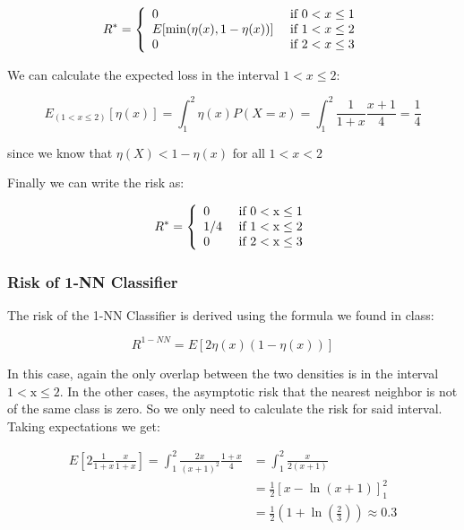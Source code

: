 \documentclass[a4paper, 11pt]{article} %
\begin{document}
$$R ^ { * } = \left\{ \begin{array} { l l } { 0 } & { \text { if } 0 < x \leq 1 } \\ {E [ \min ( \eta ( x ) , 1 - \eta ( x ) ) ] } & { \text { if } 1 < x \leq 2 } \\ { 0 } & { \text { if } 2 < x \leq 3 } \end{array} \right.$$

We can calculate the expected loss in the interval $1 < x \leq 2$:

$$E_{(1 < x \leq 2)}[\eta(x)] = \int _ { 1 } ^ { 2 } \eta ( x ) P ( X = x ) = \int _ { 1 } ^ { 2 } \frac { 1 } { 1 + x } \frac { x + 1 } { 4 } = \frac { 1 } { 4 }$$

since we know that $\eta(X) < 1-\eta(x)$ for all $1<x<2$ 

Finally we can write the risk as:

$$R ^ { * } = \left\{ \begin{array} { l l } { 0 } & { \text { if } 0 < \mathrm { x } \leq 1 } \\ { 1 / 4 } & { \text { if } 1 < \mathrm { x } \leq 2 } \\{ 0 } & { \text { if } 2 < \mathrm { x } \leq 3 } \end{array} \right.$$

\subsubsection*{Risk of 1-NN Classifier}

The risk of the 1-NN Classifier is derived using the formula we found in class: 

$$R ^ { 1 - N N } = E [ 2 \eta ( x ) ( 1 - \eta ( x ) ) ]$$ 

In this case, again the only overlap between the two densities is in the interval $1 < \mathrm { x } \leq 2$. In the other cases, the asymptotic risk that the nearest neighbor is not of the same class is zero. So we only need to calculate the risk for said interval. Taking expectations we get:

\begin{align*}
E \left[ 2 \frac { 1 } { 1 + x } \frac { x } { 1 + x } \right] = \int _ { 1 } ^ { 2 } \frac { 2 x } { ( x + 1 ) ^ { 2 } } \frac { 1 + x } { 4 } &= \int _ { 1 } ^ { 2 } \frac { x } { 2 ( x + 1 ) } \\
&=  \frac { 1 } { 2 } \left[ x - \ln ( x + 1 ) \right] _ { 1 } ^ { 2 }\\
&= \frac{1}{2} \left(1 + \ln \left(\frac{2}{3} \right) \right) \approx 0.3
\end{align*}
\end{document}
